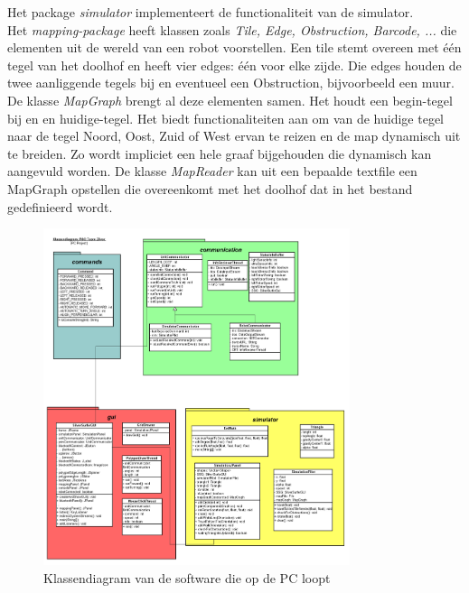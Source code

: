 \documentclass[tt3]{penoverslag}
\begin{document}
Het package \textit{simulator} implementeert de functionaliteit van de simulator. \\
Het \textit{mapping-package} heeft klassen zoals \textit{Tile, Edge, Obstruction, Barcode, ...} die elementen uit de wereld van een robot voorstellen. Een tile stemt overeen met \'e\'en tegel van het doolhof en heeft vier edges: \'e\'en voor elke zijde. Die edges houden de twee aanliggende tegels bij en eventueel een Obstruction, bijvoorbeeld een muur. De klasse \textit{MapGraph} brengt al deze elementen samen. Het houdt een begin-tegel bij en en huidige-tegel. Het biedt functionaliteiten aan om van de huidige tegel naar de tegel Noord, Oost, Zuid of West ervan te reizen en de map dynamisch uit te breiden. Zo wordt impliciet een hele graaf bijgehouden die dynamisch kan aangevuld worden. De klasse \textit{MapReader} kan uit een bepaalde textfile een MapGraph opstellen die overeenkomt met het doolhof dat in het bestand gedefinieerd wordt.


\begin{figure}[tbp]
\begin{center}
    \includegraphics[width=0.8\textwidth]{KlassendiagramPC}
    \caption{Klassendiagram van de software die op de PC loopt}
    \label{fig:klasDiaPC}
\end{center}
\end{figure}
\end{document}
